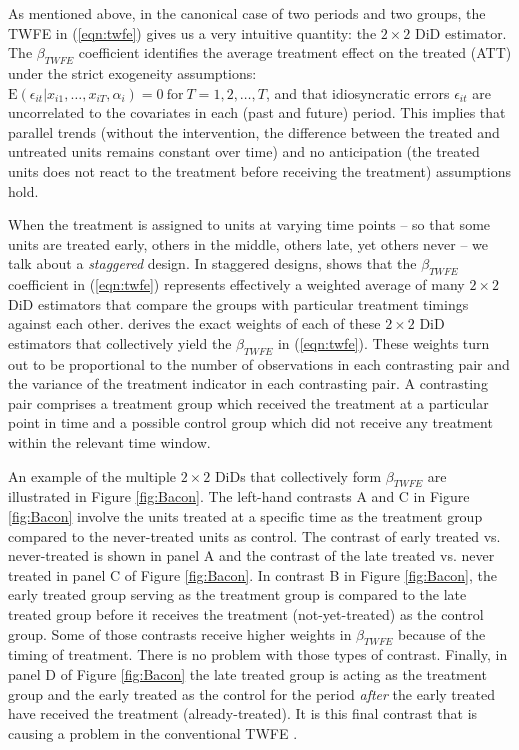 As mentioned above, in the canonical case of two periods and two groups, the TWFE in (\ref{eqn:twfe}) gives us a very intuitive quantity: the $2 \times 2$ DiD estimator. The $\beta_{TWFE}$ coefficient identifies the average treatment effect on the treated (ATT) under the strict exogeneity assumptions: $\mathrm{E}(\epsilon_{it}|x_{i1}, \ldots, x_{iT}, \alpha_i) = 0 ~ \mathrm{for}~ T = 1,2,\ldots,T$, and that idiosyncratic errors $\epsilon_{it}$ are uncorrelated to the covariates in each (past and future) period. This implies that parallel trends (without the intervention, the difference between the treated and untreated units remains constant over time) and no anticipation (the treated units does not react to the treatment before receiving the treatment) assumptions hold.

When the treatment is assigned to units at varying time points -- so that some units are treated early, others in the middle, others late, yet others never -- we talk about a \emph{staggered} design. In staggered designs, \textcite{Goodman-Bacon.2021} shows that the $\beta_{TWFE}$ coefficient in (\ref{eqn:twfe}) represents effectively a weighted average of many $2 \times 2$ DiD estimators that compare the groups with particular treatment timings against each other. \textcite{Goodman-Bacon.2021} derives the exact weights of each of these $2 \times 2$ DiD estimators that collectively yield the $\beta_{TWFE}$ in (\ref{eqn:twfe}). These weights turn out to be proportional to the number of observations in each contrasting pair and the variance of the treatment indicator in each contrasting pair. A contrasting pair comprises a treatment group which received the treatment at a particular point in time and a possible control group which did not receive any treatment within the relevant time window. 

An example of the multiple $2 \times 2$ DiDs that collectively form $\beta_{TWFE}$ are illustrated in Figure \ref{fig:Bacon}. The left-hand contrasts A and C in Figure \ref{fig:Bacon} involve the units treated at a specific time as the treatment group compared to the never-treated units as control. The contrast of early treated vs. never-treated is shown in panel A and the contrast of the late treated vs. never treated in panel C of Figure \ref{fig:Bacon}. In contrast B in Figure \ref{fig:Bacon}, the early treated group serving as the treatment group is compared to the late treated group before it receives the treatment (not-yet-treated) as the control group. Some of those contrasts receive higher weights in $\beta_{TWFE}$ because of the timing of treatment. There is no problem with those types of contrast. Finally, in panel D of Figure \ref{fig:Bacon} the late treated group is acting as the treatment group and the early treated as the control for the period \emph{after} the early treated have received the treatment (already-treated). It is this final contrast that is causing a problem in the conventional TWFE \cite{Goodman-Bacon.2021}. 

